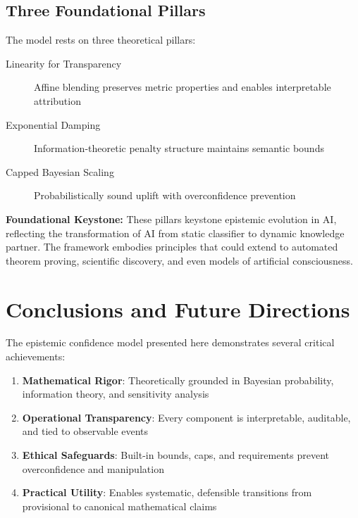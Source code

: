 \documentclass[12pt,a4paper]{article}
\theoremstyle{definition}
\theoremstyle{remark}
\begin{document}
\subsection{Three Foundational Pillars}

The model rests on three theoretical pillars:

\begin{description}
    \item[Linearity for Transparency] Affine blending preserves metric properties and enables interpretable attribution
    \item[Exponential Damping] Information-theoretic penalty structure maintains semantic bounds
    \item[Capped Bayesian Scaling] Probabilistically sound uplift with overconfidence prevention
\end{description}

\begin{reflectionbox}
\textbf{Foundational Keystone:} These pillars keystone epistemic evolution in AI, reflecting the transformation of AI from static classifier to dynamic knowledge partner. The framework embodies principles that could extend to automated theorem proving, scientific discovery, and even models of artificial consciousness.
\end{reflectionbox}



\section{Conclusions and Future Directions}

The epistemic confidence model presented here demonstrates several critical achievements:

\begin{enumerate}
    \item \textbf{Mathematical Rigor}: Theoretically grounded in Bayesian probability, information theory, and sensitivity analysis
    \item \textbf{Operational Transparency}: Every component is interpretable, auditable, and tied to observable events
    \item \textbf{Ethical Safeguards}: Built-in bounds, caps, and requirements prevent overconfidence and manipulation
    \item \textbf{Practical Utility}: Enables systematic, defensible transitions from provisional to canonical mathematical claims
\end{enumerate}
\end{document}
